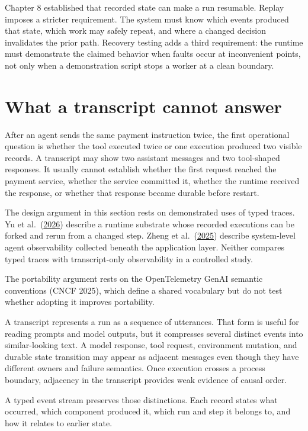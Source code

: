 Chapter 8 established that recorded state can make a run resumable. Replay imposes a stricter requirement. The system must know which events produced that state, which work may safely repeat, and where a changed decision invalidates the prior path. Recovery testing adds a third requirement: the runtime must demonstrate the claimed behavior when faults occur at inconvenient points, not only when a demonstration script stops a worker at a clean boundary.

\hypertarget{what-a-transcript-cannot-answer}{%
\section{What a transcript cannot answer}\label{what-a-transcript-cannot-answer}}

After an agent sends the same payment instruction twice, the first operational question is whether the tool executed twice or one execution produced two visible records. A transcript may show two assistant messages and two tool-shaped responses. It usually cannot establish whether the first request reached the payment service, whether the service committed it, whether the runtime received the response, or whether that response became durable before restart.

The design argument in this section rests on demonstrated uses of typed traces. Yu et al.~(\href{https://arxiv.org/abs/2605.10913}{2026}) describe a runtime substrate whose recorded executions can be forked and rerun from a changed step. Zheng et al.~(\href{https://arxiv.org/abs/2508.02736}{2025}) describe system-level agent observability collected beneath the application layer. Neither compares typed traces with transcript-only observability in a controlled study.

The portability argument rests on the OpenTelemetry GenAI semantic conventions (CNCF 2025), which define a shared vocabulary but do not test whether adopting it improves portability.

A transcript represents a run as a sequence of utterances. That form is useful for reading prompts and model outputs, but it compresses several distinct events into similar-looking text. A model response, tool request, environment mutation, and durable state transition may appear as adjacent messages even though they have different owners and failure semantics. Once execution crosses a process boundary, adjacency in the transcript provides weak evidence of causal order.

A typed event stream preserves those distinctions. Each record states what occurred, which component produced it, which run and step it belongs to, and how it relates to earlier state.

